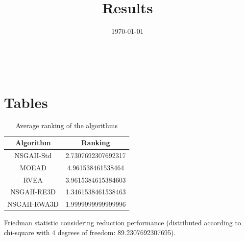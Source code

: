 \documentclass{article}
\title{Results}
\author{}
\date{\today}
\begin{document}
\oddsidemargin 0in \topmargin 0in\maketitle
\
\section{Tables}
\begin{table}[!htp]
\centering
\caption{Average ranking of the algorithms}
\begin{tabular}{c|c}
Algorithm&Ranking\\
\hline
NSGAII-Std&2.7307692307692317\\
MOEAD&4.961538461538464\\
RVEA&3.9615384615384603\\
NSGAII-RE3D&1.3461538461538463\\
NSGAII-RWA3D&1.9999999999999996\\
\end{tabular}
\end{table}


Friedman statistic considering reduction performance (distributed according to chi-square with 4 degrees of freedom: 89.2307692307695).
\end{document}
